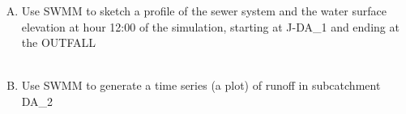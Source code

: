 \documentclass[12pt]{article}
\begin{document}
\begin{enumerate}
\begin{enumerate}[A)]
\item Use SWMM to sketch a profile of the sewer system and the water surface elevation at hour 12:00 of the simulation, starting at J-DA\_1 and ending at the OUTFALL ~\\~\\
\item Use SWMM to generate a time series (a plot) of runoff in subcatchment DA\_2  ~\\~\\
\end{enumerate}
\clearpage



\end{enumerate}
\end{document}
